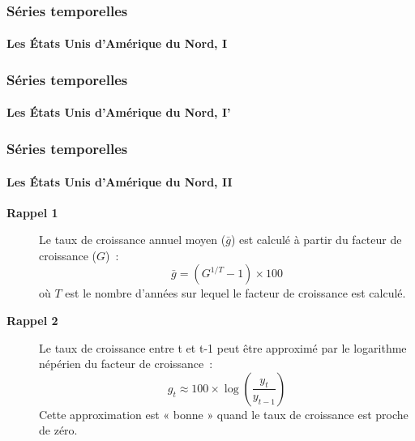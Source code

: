 \documentclass[10pt,notheorems]{beamer}
\theoremstyle{plain}
\theoremstyle{definition} %
\begin{document}
\begin{frame}
  \frametitle{Séries temporelles}
  \framesubtitle{Les États Unis d'Amérique du Nord, I}
  \begin{center}
    
  \end{center}
\end{frame}


\begin{frame}
  \frametitle{Séries temporelles}
  \framesubtitle{Les États Unis d'Amérique du Nord, I'}
  \begin{center}
    
  \end{center}
\end{frame}


\begin{frame}
  \frametitle{Séries temporelles}
  \framesubtitle{Les États Unis d'Amérique du Nord, II}

  \begin{description}

  \item[\textbf{Rappel 1}] Le taux de croissance annuel moyen ($\bar g$) est calculé à partir du facteur de croissance ($G$)~:
    \[
      \bar g = (G^{1/T}-1)\times 100
    \]
    où $T$ est le nombre d'années sur lequel le facteur de croissance est calculé.\newline

  \item[\textbf{Rappel 2}] Le taux de croissance entre t et t-1 peut être approximé par le logarithme népérien du facteur de croissance~:
    \[
      g_t \approx 100\times\log \left(\frac{y_t}{y_{t-1}}\right)
    \]
    Cette approximation est « bonne » quand le taux de croissance est proche de zéro.
  \end{description}

\end{frame}
\end{document}
